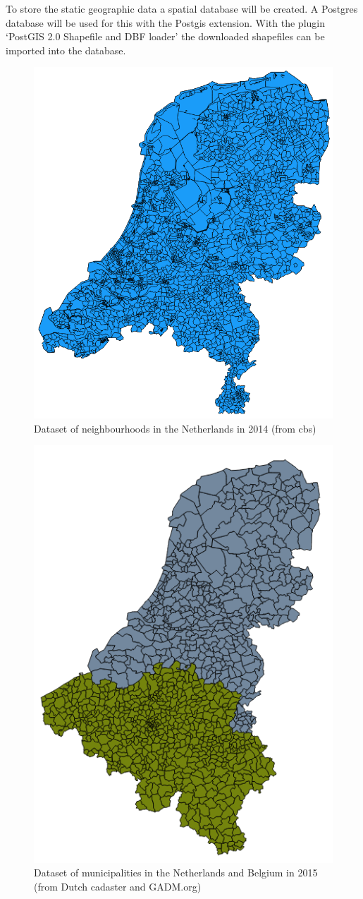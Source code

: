 To store the static geographic data a spatial database will be created. A Postgres database will be used for this with the Postgis extension. With the plugin `PostGIS 2.0 Shapefile and DBF loader' the downloaded shapefiles can be imported into the database.  

\begin{figure}
	\centering
	\includegraphics[width=0.5\linewidth]{figs/Neighbourhoods.png}
	\caption{Dataset of neighbourhoods in the Netherlands in 2014 (from \ac{cbs})}
	\label{fig:neighbourhoods}
\end{figure}

\begin{figure}
	\centering
	\includegraphics[width=0.5\linewidth]{figs/Municipalities.png}
	\caption{Dataset of municipalities in the Netherlands and Belgium in 2015 (from Dutch cadaster and GADM.org)}
	\label{fig:municipalities}
\end{figure}

